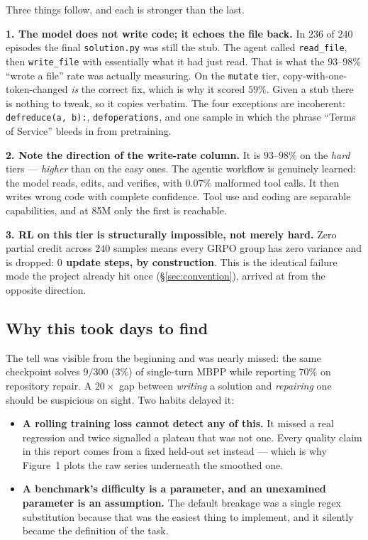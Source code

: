 \documentclass[10pt,a4paper]{article}
\newcommand{\code}[1]{\texttt{\small #1}}
\begin{document}
\noindent Three things follow, and each is stronger than the last.

\medskip\noindent\textbf{1. The model does not write code; it echoes the file
back.} In $236$ of $240$ episodes the final \code{solution.py} was still the
stub. The agent called \code{read\_file}, then \code{write\_file} with
essentially what it had just read. That is what the $93$--$98\%$ ``wrote a
file'' rate was actually measuring. On the \code{mutate} tier,
copy-with-one-token-changed \emph{is} the correct fix, which is why it scored
$59\%$. Given a stub there is nothing to tweak, so it copies verbatim. The four
exceptions are incoherent: \code{defreduce(a, b):}, \code{defoperations}, and one
sample in which the phrase ``Terms of Service'' bleeds in from pretraining.

\medskip\noindent\textbf{2. Note the direction of the write-rate column.} It is
$93$--$98\%$ on the \emph{hard} tiers --- \emph{higher} than on the easy ones.
The agentic workflow is genuinely learned: the model reads, edits, and verifies,
with $0.07\%$ malformed tool calls. It then writes wrong code with complete
confidence. Tool use and coding are separable capabilities, and at 85M only the
first is reachable.

\medskip\noindent\textbf{3. RL on this tier is structurally impossible, not
merely hard.} Zero partial credit across $240$ samples means every GRPO group
has zero variance and is dropped: \textbf{$0$ update steps, by construction}.
This is the identical failure mode the project already hit once
(\S\ref{sec:convention}), arrived at from the opposite direction.

\subsection{Why this took days to find}
\label{sec:rolling}

The tell was visible from the beginning and was nearly missed: the same
checkpoint solves $9/300$ ($3\%$) of single-turn MBPP while reporting $70\%$ on
repository repair. A $20\times$ gap between \emph{writing} a solution and
\emph{repairing} one should be suspicious on sight. Two habits delayed it:

\begin{itemize}
\item \textbf{A rolling training loss cannot detect any of this.} It missed a
real regression and twice signalled a plateau that was not one. Every quality
claim in this report comes from a fixed held-out set instead --- which is why
Figure~1 plots the raw series underneath the smoothed one.
\item \textbf{A benchmark's difficulty is a parameter, and an unexamined
parameter is an assumption.} The default breakage was a single regex
substitution because that was the easiest thing to implement, and it silently
became the definition of the task.
\end{itemize}
\end{document}
